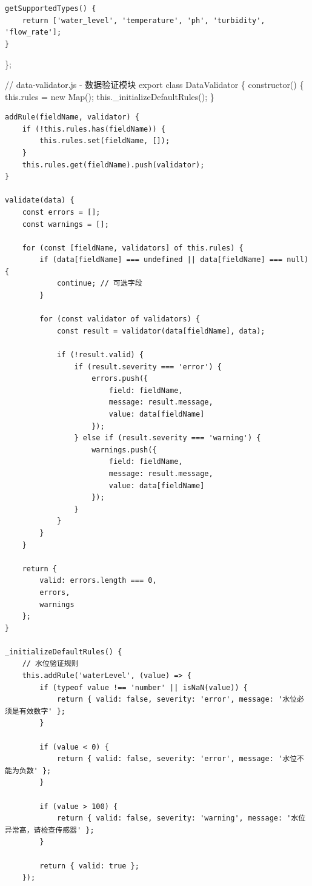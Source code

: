 {{\begin{verbatim}
getSupportedTypes() {
    return ['water_level', 'temperature', 'ph', 'turbidity', 'flow_rate'];
}
\end{verbatim}

\};

// data-validator.js - 数据验证模块 export class DataValidator \{ constructor() \{ this.rules = new Map(); this.\_initializeDefaultRules(); \}

\begin{verbatim}
addRule(fieldName, validator) {
    if (!this.rules.has(fieldName)) {
        this.rules.set(fieldName, []);
    }
    this.rules.get(fieldName).push(validator);
}

validate(data) {
    const errors = [];
    const warnings = [];
    
    for (const [fieldName, validators] of this.rules) {
        if (data[fieldName] === undefined || data[fieldName] === null) {
            continue; // 可选字段
        }
        
        for (const validator of validators) {
            const result = validator(data[fieldName], data);
            
            if (!result.valid) {
                if (result.severity === 'error') {
                    errors.push({
                        field: fieldName,
                        message: result.message,
                        value: data[fieldName]
                    });
                } else if (result.severity === 'warning') {
                    warnings.push({
                        field: fieldName,
                        message: result.message,
                        value: data[fieldName]
                    });
                }
            }
        }
    }
    
    return {
        valid: errors.length === 0,
        errors,
        warnings
    };
}

_initializeDefaultRules() {
    // 水位验证规则
    this.addRule('waterLevel', (value) => {
        if (typeof value !== 'number' || isNaN(value)) {
            return { valid: false, severity: 'error', message: '水位必须是有效数字' };
        }
        
        if (value < 0) {
            return { valid: false, severity: 'error', message: '水位不能为负数' };
        }
        
        if (value > 100) {
            return { valid: false, severity: 'warning', message: '水位异常高，请检查传感器' };
        }
        
        return { valid: true };
    });
    

\end{verbatim}}}
